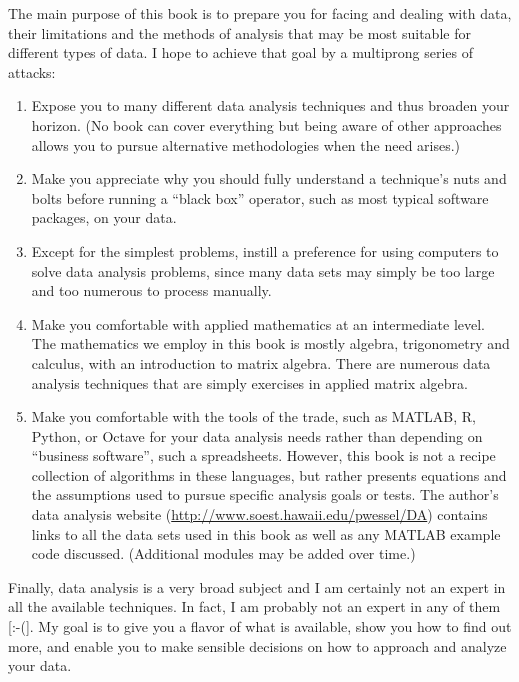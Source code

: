 The main purpose of this book is to prepare you for facing and dealing with data, their limitations and
the methods of analysis that may be most suitable for different types of data.  I hope to achieve that goal by
a multiprong series of attacks:

\begin{enumerate}
\item Expose you to many different data analysis techniques and thus broaden your horizon. (No book can cover
   everything but being aware of other approaches allows you to pursue alternative
methodologies when the need arises.)
\item Make you appreciate why you should fully understand a technique's nuts and bolts before running a ``black
   box'' operator, such as most typical software packages, on your data.
\item Except for the simplest problems, instill a preference for using computers to solve data
   analysis problems, since many data sets may simply be too large and too numerous to process manually.
\item Make you comfortable with applied mathematics at an intermediate level.  The mathematics we employ
   in this book is mostly algebra, trigonometry and calculus, with an introduction to matrix algebra.
   There are numerous data analysis techniques that are simply exercises in applied matrix algebra.
\item Make you comfortable with the tools of the trade, such as MATLAB, R, Python, or Octave for your data analysis needs
   rather than depending on ``business software'', such a spreadsheets.
   However, this book is not a recipe collection of algorithms in these languages, but rather presents equations and the
   assumptions used to pursue specific analysis goals or tests.  The author's data analysis website
   (\url{http://www.soest.hawaii.edu/pwessel/DA}) contains links to all the
   data sets used in this book as well as any MATLAB example code discussed. (Additional modules may be added over time.)
\end{enumerate}

Finally, data analysis is a very broad subject and I am certainly not an expert in all the available
techniques. In fact, I am probably not an expert in any of them [:-(].  My goal is to give you a flavor
of what is available, show you how to find out more, and enable you to make sensible decisions on how
to approach and analyze your data.

